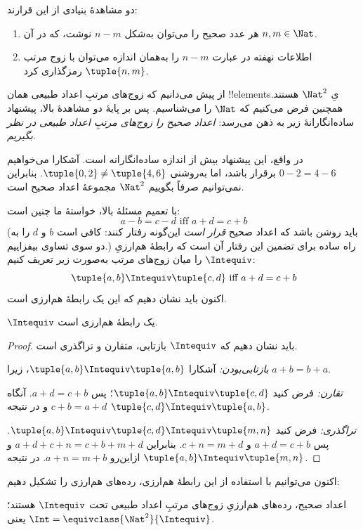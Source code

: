 \documentclass[../../../include/open-logic-section]{subfiles}
\begin{document}

دو مشاهدهٔ بنیادی از این قرارند:
	\begin{enumerate}
		\item هر عدد صحیح را می‌توان به‌شکل $n - m$ نوشت، که در آن $n, m \in\Nat$.
		\item اطلاعات نهفته در عبارت $n - m$ را به‌همان اندازه می‌توان با زوج مرتب $\tuple{n, m}$ رمزگذاری کرد.
	\end{enumerate}
از پیش می‌دانیم که زوج‌های مرتبِ اعداد طبیعی همان !!{element}sیِ $\Nat^2$ هستند. همچنین فرض می‌کنیم که $\Nat$ را می‌شناسیم. پس بر پایهٔ دو مشاهدهٔ بالا، پیشنهاد ساده‌انگارانهٔ زیر به ذهن می‌رسد: \emph{اعداد صحیح را زوج‌های مرتبِ اعداد طبیعی در نظر بگیریم}.

در واقع، این پیشنهاد بیش از اندازه ساده‌انگارانه است. آشکارا می‌خواهیم $0- 2 = 4 - 6$ برقرار باشد، اما به‌روشنی $\tuple{0, 2 }\neq \tuple{4, 6}$. بنابراین نمی‌توانیم صرفاً بگوییم $\Nat^2$ مجموعهٔ اعداد صحیح است.

با تعمیم مسئلهٔ بالا، خواستهٔ ما چنین است:
	$$a - b = c - d \text{ iff }a + d = c + b$$
(باید روشن باشد که اعداد صحیح \emph{قرار است} این‌گونه رفتار کنند: کافی است $b$ و $d$ را به دو سوی تساوی بیفزاییم.) راه ساده برای تضمین این رفتار آن است که رابطهٔ هم‌ارزیِ $\Intequiv$ را میان زوج‌های مرتب به‌صورت زیر تعریف کنیم:
$$\tuple{ a, b } \Intequiv \tuple{c, d}\text{ iff }a + d = c + b$$
اکنون باید نشان دهیم که این یک رابطهٔ هم‌ارزی است.
\begin{prop} $\Intequiv$ یک رابطهٔ هم‌ارزی است.
\end{prop}
	\begin{proof}
	باید نشان دهیم که $\Intequiv$ بازتابی، متقارن و تراگذری است.

	\emph{بازتابی‌بودن:} آشکارا $\tuple{a, b} \Intequiv \tuple{a, b}$، زیرا $a + b = b + a$.

	\emph{تقارن:} فرض کنید $\tuple{a, b} \Intequiv \tuple{c, d}$؛ پس $a + d = c + b$. آنگاه $c + b = a + d$ و در نتیجه $\tuple{c, d} \Intequiv \tuple{a, b}$.

	\emph{تراگذری:} فرض کنید $\tuple{a, b} \Intequiv \tuple{c, d}\Intequiv \tuple{m, n}$. پس $a + d = c + b$ و $c + n = m + d$. بنابراین $a + d + c + n = c + b + m + d$ و ازاین‌رو $a + n = m + b$. در نتیجه $\tuple{a, b } \Intequiv \tuple{m, n}$.
\end{proof}

اکنون می‌توانیم با استفاده از این رابطهٔ هم‌ارزی، رده‌های هم‌ارزی را تشکیل دهیم:

\begin{defn}
		اعداد صحیح، رده‌های هم‌ارزیِ زوج‌های مرتبِ اعداد طبیعی تحت $\Intequiv$ هستند؛ یعنی $\Int = \equivclass{\Nat^2}{\Intequiv}$.
\end{defn}
\end{document}
